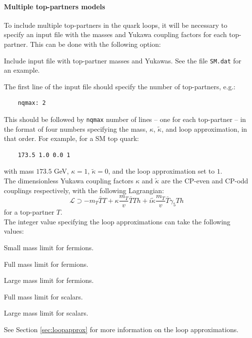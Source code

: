 \documentclass[12pt,a4wide]{article}
\begin{document}
\paragraph{Multiple top-partners models}
To include multiple top-partners in the quark loops, it will be necessary to specify an input file with the masses and Yukawa coupling factors for each top-partner. This can be done with the following option: 
\begin{description}[labelindent=\parindent, labelwidth =\widthof{\bfseries9999999999999999999999}, leftmargin = !] 
	\item[\texttt{-i, --i <file>}] Include input file with top-partner masses and Yukawas. See the file \texttt{SM.dat} for an example. 
\end{description} 
The first line of the input file should specify the number of top-partners, e.g.: 
\begin{lstlisting}
	nqmax: 2 
\end{lstlisting}
This should be followed by \texttt{nqmax} number of lines -- one for each top-partner -- in the format of four numbers specifying the mass, $\kappa$, $\tilde{\kappa}$, and loop approximation, in that order. For example, for a SM top quark: 
\begin{lstlisting}
	173.5 1.0 0.0 1 
\end{lstlisting}
with mass $173.5$ GeV, $\kappa = 1$, $\tilde{\kappa} = 0$, and the loop approximation set to $1$. \\ 

The dimensionless Yukawa coupling factors $\kappa$ and $\tilde{\kappa}$ are the CP-even and CP-odd couplings respectively, with the following Lagrangian: 
\begin{equation}
	\mathcal{L} \supset -m_T \bar{T}T + \kappa \frac{m_T}{v} \bar{T}T h + i \tilde{\kappa} \frac{m_T}{v} \bar{T} \gamma_5 T h 
\end{equation}
for a top-partner $T$. \\ 

The integer value specifying the loop approximations can take the following values: 
\begin{description}[labelindent=3\parindent, labelwidth =\widthof{\bfseries9999}, leftmargin = !] 
	\item[$0$] Small mass limit for fermions. 
	\item[$1$] Full mass limit for fermions. 
	\item[$2$] Large mass limit for fermions. 
	\item[$3$] Full mass limit for scalars. 
	\item[$4$] Large mass limit for scalars. 
\end{description}
See Section \ref{sec:loopapprox} for more information on the loop approximations. 
\end{document}
